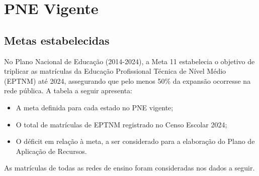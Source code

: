\section{PNE Vigente} 

\subsection{Metas estabelecidas}

No Plano Nacional de Educação (2014-2024), a Meta 11 estabelecia o objetivo de triplicar as matrículas da Educação Profissional Técnica de Nível Médio (EPTNM) até 2024, assegurando que pelo menos 50\% da expansão ocorresse na rede pública. A tabela a seguir apresenta:
\begin{itemize}
	\item A meta definida para cada estado no PNE vigente;
	\item O total de matrículas de EPTNM registrado no Censo Escolar 2024;
	\item O déficit em relação à meta, a ser considerado para a elaboração do Plano de Aplicação de Recursos.
\end{itemize}

As matrículas de todas as redes de ensino foram consideradas nos dados a seguir. 


